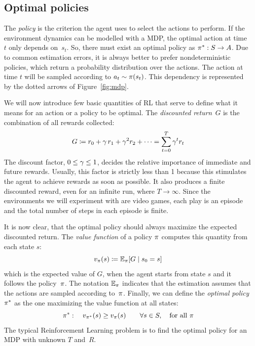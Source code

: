 \subsection{Optimal policies}

The \emph{policy} is the criterion the agent uses to select the actions to
perform. If the environment dynamics can be modelled with a MDP, the
optimal action at time~$t$ only depends on~$s_{t}$. So, there must exist
an optimal policy as $\pi^*: S \to A$. Due to common estimation
errors, it is always better to prefer nondeterministic policies, which return
a probability distribution over the actions. The action at time $t$ will be
sampled according to $a_t \sim \pi(s_t)$. This dependency is represented
by the dotted arrows of Figure~\ref{fig:mdp}.

We will now introduce few basic quantities of RL that serve to define what it
means for an action or a policy to be optimal. The \emph{discounted
return}~$G$ is the combination of all rewards collected:
\begin{equation}
	G \coloneqq r_{0} + \gamma\, r_1 + \gamma^2 r_2 + \dots =
	\sum_{t=0}^{T} \gamma^{t} r_{t}
	\label{eq:return}
\end{equation}
The discount factor, $0 \le \gamma \le 1$, decides the relative importance
of immediate and future rewards. Usually, this factor is strictly less than 1
because this stimulates the agent to achieve rewards as soon as possible.
It also produces a finite discounted reward, even for an infinite run, where
$T \to \infty$.  Since the environments we will experiment with are video
games, each play is an episode and the total number of steps in each episode
is finite.

It is now clear, that the optimal policy should always maximize the expected
discounted return. The \emph{value function} of a policy $\pi$ computes
this quantity from each state $s$:
\begin{equation}
	v_{\pi}(s) \coloneqq \mathbb{E}_{\pi}[G \mid s_0 = s]
\end{equation}
which is the expected value of $G$, when the agent starts from state $s$
and it follows the policy~$\pi$. The notation $\mathbb{E}_{\pi}$ indicates
that the estimation assumes that the actions are sampled according
to~$\pi$. Finally, we can define the \emph{optimal policy} $\pi^*$ as
the one maximizing the value function at all states:
\begin{equation}
	\pi^*: \quad v_{\pi^*}(s) \ge v_{\pi}(s) \qquad \forall s \in
	S, \quad \text{for all $\pi$}
\end{equation}
The typical Reinforcement Learning problem is to find the optimal policy for
an MDP with unknown $T$ and~$R$.

